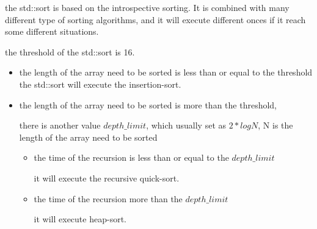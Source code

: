 \begin{parts}
\begin{solution}
    the std::sort is based on the introspective sorting. It is combined with many different type
    of sorting algorithms, and it will execute different onces if it reach some different situations.

    the threshold of the std::sort is 16.

    \begin{itemize}
      \item the length of the array need to be sorted is less than or equal to the threshold
      the std::sort will execute the insertion-sort.
      
      \item the length of the array need to be sorted is more than the threshold,
        
      there is another value \(depth\_limit\), which usually set as \(2*logN\), N is the length of the array need to be sorted

      \begin{itemize}
        \item the time of the recursion is less than or equal to the \(depth\_limit\)
        
        it will execute the recursive quick-sort.

        \item the time of the recursion more than the \(depth \_ limit\)
        
        it will execute heap-sort.
      \end{itemize}

    \end{itemize}
     

  \end{solution}
\end{parts}